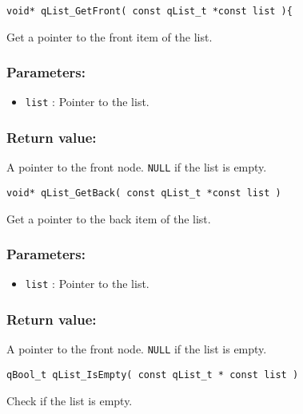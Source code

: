 \noindent\hrulefill

\begin{lstlisting}[style=CStyle]
void* qList_GetFront( const qList_t *const list ){
\end{lstlisting}

Get a pointer to the front item of the list. 

\subsubsection*{Parameters:}
\begin{itemize}
    \item \lstinline{list} : Pointer to the list. 
\end{itemize}

\subsubsection*{Return value:}
A pointer to the front node. \lstinline{NULL} if the list is empty.

\noindent\hrulefill

\begin{lstlisting}[style=CStyle]
void* qList_GetBack( const qList_t *const list )
\end{lstlisting}

Get a pointer to the back item of the list. 

\subsubsection*{Parameters:}
\begin{itemize}
    \item \lstinline{list} : Pointer to the list. 
\end{itemize}

\subsubsection*{Return value:}
A pointer to the front node. \lstinline{NULL} if the list is empty.


\noindent\hrulefill

\begin{lstlisting}[style=CStyle]
qBool_t qList_IsEmpty( const qList_t * const list )
\end{lstlisting}

Check if the list is empty. 

